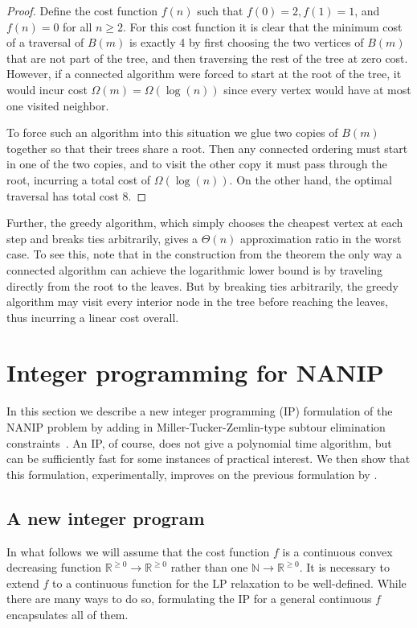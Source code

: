 \begin{proof}
Define the cost function $f(n)$ such that $f(0) = 2, f(1) = 1$, and $f(n) = 0$
for all $n \geq 2$. For this cost function it is clear that the minimum cost of
a traversal of $B(m)$ is exactly 4 by first choosing the two vertices of $B(m)$
that are not part of the tree, and then traversing the rest of the tree at zero
cost. However, if a connected algorithm were forced to start at the root of the
tree, it would incur cost $\Omega(m) = \Omega(\log(n))$ since every vertex
would have at most one visited neighbor. 

To force such an algorithm into this situation we glue two copies of $B(m)$
together so that their trees share a root. Then any connected ordering must
start in one of the two copies, and to visit the other copy it must pass
through the root, incurring a total cost of $\Omega(\log(n))$. On the other
hand, the optimal traversal has total cost 8. 

\end{proof}

Further, the greedy algorithm, which simply chooses the cheapest vertex at each
step and breaks ties arbitrarily, gives a $\Theta(n)$ approximation ratio in
the worst case. To see this, note that in the construction from the theorem the
only way a connected algorithm can achieve the logarithmic lower bound is by
traveling directly from the root to the leaves. But by breaking ties
arbitrarily, the greedy algorithm may visit every interior node in the tree
before reaching the leaves, thus incurring a linear cost overall.


\section{Integer programming for NANIP}\label{section:IP}

In this section we describe a new integer programming (IP) formulation of the
NANIP problem by adding in Miller-Tucker-Zemlin-type subtour elimination
constraints~\cite{miller1960integer}.  An IP, of course, does not give a
polynomial time algorithm, but can be sufficiently fast for some instances of
practical interest.  We then show that this formulation, experimentally,
improves on the previous formulation by \cite{Gutfraind14}.

\subsection{A new integer program}

In what follows we will assume that the cost function $f$ is a continuous
convex decreasing function $\mathbb{R}^{\geq 0} \to \mathbb{R}^{\geq 0}$ rather
than one $\mathbb{N} \to \mathbb{R}^{\geq 0}$. It is necessary to extend $f$ to
a continuous function for the LP relaxation to be well-defined.  While there
are many ways to do so, formulating the IP for a general continuous $f$
encapsulates all of them.

